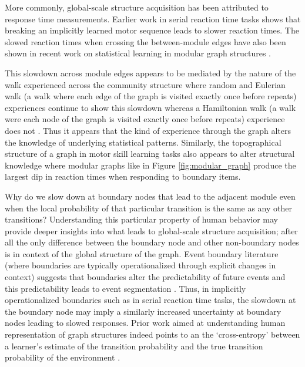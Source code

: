 More commonly, global-scale structure acquisition has been attributed to response time measurements. Earlier work in serial reaction time tasks \cite{nissen1987attentional, cleeremans1991learning} shows that breaking an implicitly learned motor sequence leads to slower reaction times. The slowed reaction times when crossing the between-module edges have also been shown in recent work on statistical learning in modular graph structures \cite{kahn2018network, lynn2020humans, karuza2017process, karuza2022value, karuza2019human, lynn2020human}. 

This slowdown across module edges appears to be mediated by the nature of the walk experienced across the community structure where random and Eulerian walk (a walk where each edge of the graph is visited exactly once before repeats) experiences continue to show this slowdown whereas a Hamiltonian walk (a walk were each node of the graph is visited exactly once before repeats) experience does not \cite{karuza2017process}. Thus it appears that the kind of experience through the graph alters the knowledge of underlying statistical patterns. Similarly, the topographical structure of a graph in motor skill learning tasks also appears to alter structural knowledge \cite{lynn2020abstract, lynn2020human, lynn2020humans} where modular graphs like in Figure \ref{fig:modular_graph} produce the largest dip in reaction times when responding to boundary items.

Why do we slow down at boundary nodes that lead to the adjacent module even when the local probability of that particular transition is the same as any other transitions? Understanding this particular property of human behavior may provide deeper insights into what leads to global-scale structure acquisition; after all the only difference between the boundary node and other non-boundary nodes is in context of the global structure of the graph. Event boundary literature (where boundaries are typically operationalized through explicit changes in context) suggests that boundaries alter the predictability of future events and this predictability leads to event segmentation \cite{zacks2007event, clewett2019transcending}. Thus, in implicitly operationalized boundaries such as in serial reaction time tasks, the slowdown at the boundary node may imply a similarly increased uncertainty at boundary nodes leading to slowed responses. Prior work aimed at understanding human representation of graph structures indeed points to an the `cross-entropy' between a learner's estimate of the transition probability and the true transition probability of the environment \cite{lynn2020abstract, lynn2020humans, lynn2020human}. 

